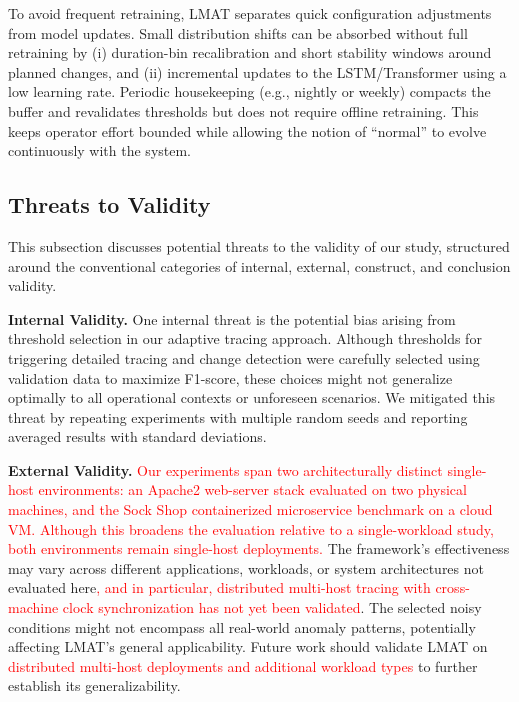 \documentclass[preprint,12pt]{elsarticle}
\begin{document}
To avoid frequent retraining, LMAT separates quick configuration adjustments from model updates. Small distribution shifts can be absorbed without full retraining by (i) duration-bin recalibration and short stability windows around planned changes, and (ii) incremental updates to the LSTM/Transformer using a low learning rate. Periodic housekeeping (e.g., nightly or weekly) compacts the buffer and revalidates thresholds but does not require offline retraining. This keeps operator effort bounded while allowing the notion of “normal” to evolve continuously with the system.


\subsection{Threats to Validity}

This subsection discusses potential threats to the validity of our study, structured around the conventional categories of internal, external, construct, and conclusion validity.

\textbf{Internal Validity.} One internal threat is the potential bias arising from threshold selection in our adaptive tracing approach. Although thresholds for triggering detailed tracing and change detection were carefully selected using validation data to maximize F1-score, these choices might not generalize optimally to all operational contexts or unforeseen scenarios. We mitigated this threat by repeating experiments with multiple random seeds and reporting averaged results with standard deviations.

\textbf{External Validity.} \textcolor{red}{Our experiments span two architecturally distinct single-host environments: an Apache2 web-server stack evaluated on two physical machines, and the Sock Shop containerized microservice benchmark on a cloud VM. Although this broadens the evaluation relative to a single-workload study, both environments remain single-host deployments.} The framework's effectiveness may vary across different applications, workloads, or system architectures not evaluated here\textcolor{red}{, and in particular, distributed multi-host tracing with cross-machine clock synchronization has not yet been validated}. The selected noisy conditions might not encompass all real-world anomaly patterns, potentially affecting LMAT's general applicability. Future work should validate LMAT on \textcolor{red}{distributed multi-host deployments and additional workload types} to further establish its generalizability.
\end{document}
